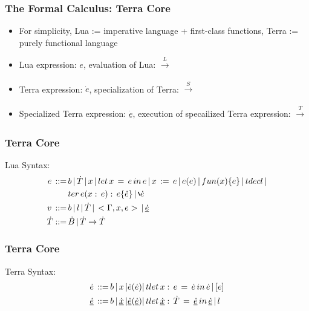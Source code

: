 \documentclass{beamer}
\begin{document}
\begin{frame}
	\frametitle{The Formal Calculus: Terra Core}
  \begin{itemize}
  \item For simplicity, Lua := imperative language + first-class functions, Terra := purely functional language\pause
  \item Lua expression: $e$, evaluation of Lua: $\xrightarrow[]{L}$\pause
  \item Terra expression: $\dot{e}$, specialization of Terra: $\xrightarrow[]{S}$\pause
  \item Specialized Terra expression: $\underline{\dot{e}}$, execution of specailized Terra expression: $\xrightarrow[]{T}$
  \end{itemize}
\end{frame}

\begin{frame}
	\frametitle{Terra Core}
  Lua Syntax:
  \newline
  \begin{equation}
    \begin{split}
      e\, ::=\, & b\, |\, \dot{T}\, |\, x\, |\, let\, x\, =\, e\, in\, e\, |\, x\, :=\, e\, |\, e(e)\, |\, fun(x)\{e\}\, |\, tdecl\, | \\ & ter\, e(x:\, e):\, e \{\dot{e}\}\, |\, \backprime \dot{e}\\
      v\, ::=\, & b\, |\, l\, |\, \dot{T}\, |\, <\Gamma, x, e>\, |\, \underline{\dot{e}}\\
      \dot{T} ::=\, & \dot{B}\, |\, \dot{T} \rightarrow \dot{T}
    \end{split} \notag
  \end{equation}
\end{frame}

\begin{frame}
	\frametitle{Terra Core}
  Terra Syntax:
  \newline
  \begin{equation}
    \begin{split}
      \dot{e}\, ::=\, & b\, |\, x\, | \dot{e}(\dot{e}) |\, tlet\, x:\, e\, =\, \dot{e}\, in\, \dot{e}\, |\, [e]\\
      \underline{\dot{e}}\, ::=\, & b\, |\, \underline{\dot{x}}\, | \underline{\dot{e}}(\underline{\dot{e}}) |\, tlet\, \underline{\dot{x}}:\, \dot{T}\, =\, \underline{\dot{e}}\, in\, \underline{\dot{e}}\, |\, l
    \end{split} \notag
  \end{equation}
\end{frame}
\end{document}
